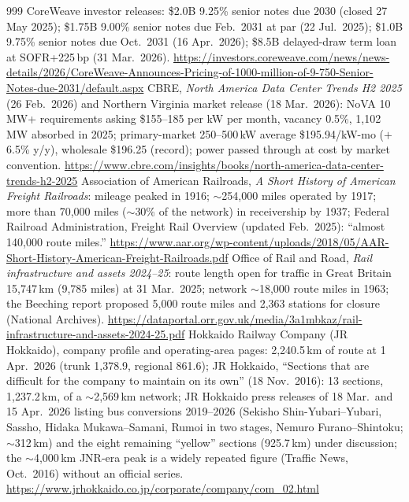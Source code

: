 \begin{thebibliography}{999}
 CoreWeave investor releases: \$2.0B 9.25\% senior notes due 2030 (closed 27 May 2025); \$1.75B 9.00\% senior notes due Feb.\ 2031 at par (22 Jul.\ 2025); \$1.0B 9.75\% senior notes due Oct.\ 2031 (16 Apr.\ 2026); \$8.5B delayed-draw term loan at SOFR+225\,bp (31 Mar.\ 2026). \url{https://investors.coreweave.com/news/news-details/2026/CoreWeave-Announces-Pricing-of-1000-million-of-9-750-Senior-Notes-due-2031/default.aspx}
 CBRE, \emph{North America Data Center Trends H2 2025} (26 Feb.\ 2026) and Northern Virginia market release (18 Mar.\ 2026): NoVA 10\,MW+ requirements asking \$155--185 per kW per month, vacancy 0.5\%, 1,102\,MW absorbed in 2025; primary-market 250--500\,kW average \$195.94/kW-mo ($+$6.5\% y/y), wholesale \$196.25 (record); power passed through at cost by market convention. \url{https://www.cbre.com/insights/books/north-america-data-center-trends-h2-2025}
 Association of American Railroads, \emph{A Short History of American Freight Railroads}: mileage peaked in 1916; $\sim$254,000 miles operated by 1917; more than 70,000 miles ($\sim$30\% of the network) in receivership by 1937; Federal Railroad Administration, Freight Rail Overview (updated Feb.\ 2025): ``almost 140,000 route miles.'' \url{https://www.aar.org/wp-content/uploads/2018/05/AAR-Short-History-American-Freight-Railroads.pdf}
 Office of Rail and Road, \emph{Rail infrastructure and assets 2024--25}: route length open for traffic in Great Britain 15,747\,km (9,785 miles) at 31 Mar.\ 2025; network $\sim$18,000 route miles in 1963; the Beeching report proposed 5,000 route miles and 2,363 stations for closure (National Archives). \url{https://dataportal.orr.gov.uk/media/3a1mbkaz/rail-infrastructure-and-assets-2024-25.pdf}
 Hokkaido Railway Company (JR Hokkaido), company profile and operating-area pages: 2,240.5\,km of route at 1 Apr.\ 2026 (trunk 1,378.9, regional 861.6); JR Hokkaido, ``Sections that are difficult for the company to maintain on its own'' (18 Nov.\ 2016): 13 sections, 1,237.2\,km, of a $\sim$2,569\,km network; JR Hokkaido press releases of 18 Mar.\ and 15 Apr.\ 2026 listing bus conversions 2019--2026 (Sekisho Shin-Yubari--Yubari, Sassho, Hidaka Mukawa--Samani, Rumoi in two stages, Nemuro Furano--Shintoku; $\sim$312\,km) and the eight remaining ``yellow'' sections (925.7\,km) under discussion; the $\sim$4,000\,km JNR-era peak is a widely repeated figure (Traffic News, Oct.\ 2016) without an official series. \url{https://www.jrhokkaido.co.jp/corporate/company/com_02.html}

\end{thebibliography}
